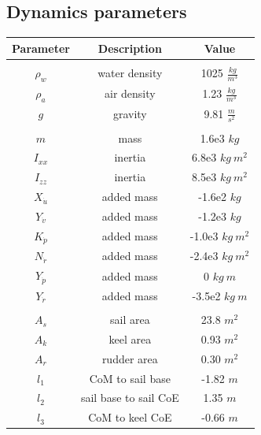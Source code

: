 \documentclass[conference]{IEEEtran}
\begin{document}
\FloatBarrier
\printbibliography

\newpage
\appendix

\subsection{Dynamics parameters}

\begin{table}[ht]
\centering
\begin{tabular}{c|c|c}
\textbf{Parameter} & \textbf{Description} & \textbf{Value} \\
\hline & \\[-6pt]
    $\rho_w$    & water density & 1025 $\frac{kg}{m^3}$ \\[4pt]
    $\rho_a$    & air density   & 1.23 $\frac{kg}{m^3}$ \\[4pt]
    $g$         & gravity       & 9.81 $\frac{m}{s^2}$  \\[4pt]
\hline & \\[-6pt]
    $m$             & mass          & 1.6e3 $kg$        \\[4pt]
    $I_{xx}$        & inertia       & 6.8e3 $kg\ m^2$   \\[4pt]
    $I_{zz}$        & inertia       & 8.5e3 $kg\ m^2$   \\[4pt]
    $X_{\dot{u}}$   & added mass    & -1.6e2 $kg$       \\[4pt]
    $Y_{\dot{v}}$   & added mass    & -1.2e3 $kg$       \\[4pt]
    $K_{\dot{p}}$   & added mass    & -1.0e3 $kg\ m^2$  \\[4pt]
    $N_{\dot{r}}$   & added mass    & -2.4e3 $kg\ m^2$  \\[4pt]
    $Y_{\dot{p}}$   & added mass    & 0 $kg\ m$         \\[4pt]
    $Y_{\dot{r}}$   & added mass    & -3.5e2 $kg\ m$    \\[4pt]
\hline & \\[-6pt]
    $A_s$       & sail area             & 23.8 $m^2$    \\[4pt]
    $A_k$       & keel area             & 0.93 $m^2$    \\[4pt]
    $A_r$       & rudder area           & 0.30 $m^2$    \\[4pt]
    $l_1$       & CoM to sail base      & -1.82 $m$     \\[4pt]
    $l_2$       & sail base to sail CoE & 1.35 $m$      \\[4pt]
    $l_3$       & CoM to keel CoE       & -0.66 $m$     \\[4pt]

\end{tabular}
\end{table}
\end{document}
